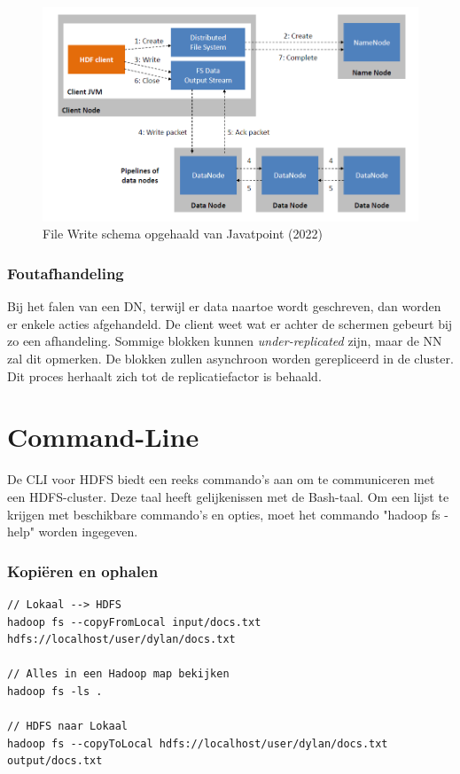 \documentclass[a4paper,10pt,twoside]{report}
\begin{document}
\begin{figure}
	\includegraphics[width=\linewidth]{images/HDFS-Write.png}
	\caption{File Write schema opgehaald van Javatpoint (2022)}
\end{figure}

\subsubsection{Foutafhandeling}

Bij het falen van een DN, terwijl er data naartoe wordt geschreven, dan worden er enkele acties afgehandeld. De client weet wat er achter de schermen gebeurt bij zo een afhandeling. Sommige blokken kunnen \textit{under-replicated} zijn, maar de NN zal dit opmerken. De blokken zullen asynchroon worden gerepliceerd in de cluster. Dit proces herhaalt zich tot de replicatiefactor is behaald.

\section{Command-Line}

De CLI voor HDFS biedt een reeks commando's aan om te communiceren met een HDFS-cluster. Deze taal heeft gelijkenissen met de Bash-taal. Om een lijst te krijgen met beschikbare commando's en opties, moet het commando "hadoop fs -help" worden ingegeven.

\subsubsection{Kopiëren en ophalen}

\begin{lstlisting}[language=Hadoop]
// Lokaal --> HDFS
hadoop fs --copyFromLocal input/docs.txt hdfs://localhost/user/dylan/docs.txt

// Alles in een Hadoop map bekijken
hadoop fs -ls .

// HDFS naar Lokaal
hadoop fs --copyToLocal hdfs://localhost/user/dylan/docs.txt output/docs.txt
\end{lstlisting}
\end{document}
